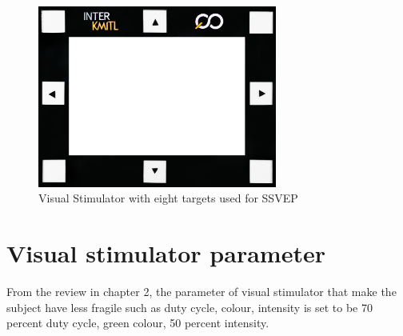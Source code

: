 \begin{figure}[ht]
	\centering
	\includegraphics[width=0.7\textwidth]{chapter7/frame_8.jpg}
	\caption{Visual Stimulator with eight targets used for SSVEP}
\end{figure}

\section{Visual stimulator parameter}
\hspace{1.5cm}From the review in chapter 2, the parameter of visual stimulator that make the subject have less fragile such as duty cycle, colour, intensity is set to be 70 percent duty cycle, green colour, 50 percent intensity. 